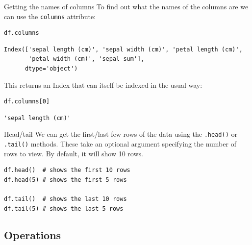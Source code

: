 \documentclass[10pt]{beamer}
\begin{document}
\begin{frame}[label={sec:org5eeff61},fragile]{Getting the names of columns}
 To find out what the names of the columns are we can use the \texttt{columns} attribute:

\begin{verbatim}
df.columns
\end{verbatim}

\begin{verbatim}
Index(['sepal length (cm)', 'sepal width (cm)', 'petal length (cm)',
       'petal width (cm)', 'sepal sum'],
      dtype='object')
\end{verbatim}

This returns an Index that can itself be indexed in the usual way:

\begin{verbatim}
df.columns[0]
\end{verbatim}

\begin{verbatim}
'sepal length (cm)'
\end{verbatim}
\end{frame}

\begin{frame}[label={sec:org1086120},fragile]{Head/tail}
 We can get the first/last few rows of the data using the \texttt{.head()} or \texttt{.tail()}
methods. These take an optional argument specifying the number of rows to
view. By default, it will show 10 rows.

\begin{verbatim}
df.head()  # shows the first 10 rows
df.head(5) # shows the first 5 rows

df.tail()  # shows the last 10 rows
df.tail(5) # shows the last 5 rows
\end{verbatim}
\end{frame}


\subsection{Operations}
\label{sec:org13709ea}
\end{document}
